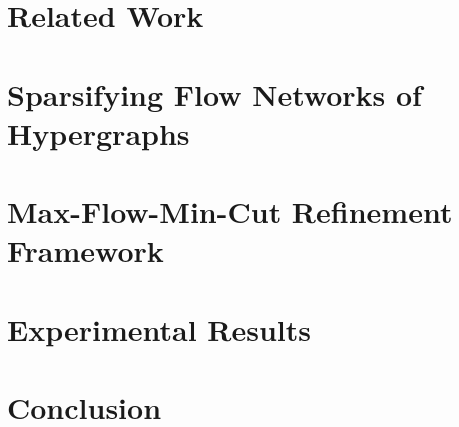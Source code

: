 \documentclass[12pt,a4paper,twoside, enabledeprecatedfontcommands]{scrartcl}
\numberwithin{equation}{section}
\begin{document}


\newpage


\section{Related Work}
\label{sec:related_work}



\newpage


\section{Sparsifying Flow Networks of Hypergraphs}
\label{sec:opt_flow_network}


\newpage


\section{Max-Flow-Min-Cut Refinement Framework}
\label{sec:flow_refinement}



\newpage


\section{Experimental Results}
\label{sec:experiments}



\newpage


\section{Conclusion}
\label{sec:conclusion}



\newpage





\newpage

\begin{appendix}

\end{appendix}

\end{document}
